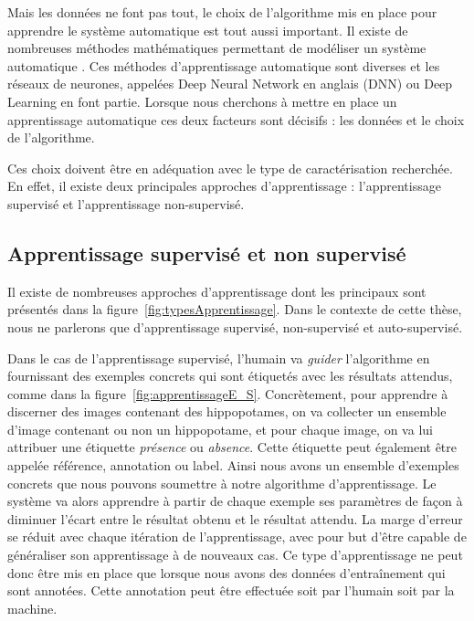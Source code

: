 Mais les données ne font pas tout, le choix de l'algorithme mis en place pour apprendre le système automatique est tout aussi important. Il existe de nombreuses méthodes mathématiques permettant de modéliser un système automatique . Ces méthodes d'apprentissage automatique sont diverses et les réseaux de neurones, appelées Deep Neural Network en anglais (DNN) ou Deep Learning en font partie.
Lorsque nous cherchons à mettre en place un apprentissage automatique ces deux facteurs sont décisifs : les données et le choix de l'algorithme.

Ces choix doivent être en adéquation avec le type de caractérisation recherchée. En effet, il existe deux principales approches d'apprentissage : l'apprentissage supervisé et l'apprentissage non-supervisé.

\subsection{Apprentissage supervisé et non supervisé}

Il existe de nombreuses approches d'apprentissage dont les principaux sont présentés dans la figure~\ref{fig:typesApprentissage}. Dans le contexte de cette thèse, nous ne parlerons que d'apprentissage supervisé, non-supervisé et auto-supervisé.

Dans le cas de l'apprentissage supervisé, l'humain va \textit{guider} l’algorithme en fournissant des exemples concrets qui sont étiquetés avec les résultats attendus, comme dans la figure~\ref{fig:apprentissageE_S}. Concrètement, pour apprendre à discerner des images contenant des hippopotames, on va collecter un ensemble d'image contenant ou non un hippopotame, et pour chaque image, on va lui attribuer une étiquette \textit{présence} ou \textit{absence}. Cette étiquette peut également être appelée référence, annotation ou label. Ainsi nous avons un ensemble d'exemples concrets que nous pouvons soumettre à notre algorithme d'apprentissage.
Le système va alors apprendre à partir de chaque exemple ses paramètres de façon à diminuer l’écart entre le résultat obtenu et le résultat attendu. La marge d’erreur se réduit avec chaque itération de l'apprentissage, avec pour but d’être capable de généraliser son apprentissage à de nouveaux cas. Ce type d'apprentissage ne peut donc être mis en place que lorsque nous avons des données d’entraînement qui sont annotées. Cette annotation peut être effectuée soit par l'humain soit par la machine.




